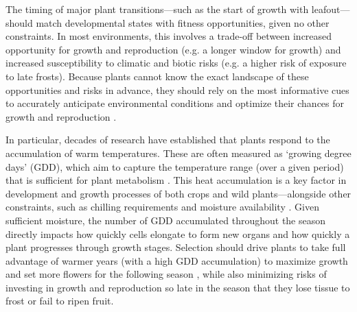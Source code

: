 \documentclass[11pt,letter]{article}
\newcommand{\llabel}[1]{\hypertarget{lintarget:#1}{}\linelabel{lin:#1}}
\begin{document}
The timing of major plant transitions---such as the start of growth with leafout---should match developmental states with fitness opportunities, given no other constraints. In most environments, this involves a trade-off between increased opportunity for growth and reproduction (e.g. a longer window for growth) and increased susceptibility to climatic and biotic risks (e.g. a higher risk of exposure to late frosts). Because plants cannot know the exact landscape of these opportunities and risks in advance, they should rely on the most informative cues to accurately anticipate environmental conditions and optimize their chances for growth and reproduction \citep{Chevin2015, Bonamour2019}.

In particular, decades of research have established that plants respond to the accumulation of warm temperatures. These are often measured as `growing degree days' (GDD), which aim to capture the temperature range (over a given period) that is sufficient for plant metabolism \citep{Chuine2017}.
This heat accumulation is a key factor in development and growth processes of both crops and wild plants---\llabel{moist2}alongside other constraints, such as chilling requirements \citep{Chuine2017} and moisture availability \citep{Garonna2018}. \llabel{moist3}Given sufficient moisture, the number of GDD accumulated throughout the season directly impacts how quickly cells elongate to form new organs and how quickly a plant progresses through growth stages. Selection should drive plants to take full advantage of warmer years (with a high GDD accumulation) to maximize growth and set more flowers for the following season \citep{larcher1980}, while also minimizing risks of investing in growth and reproduction so late in the season that they lose tissue to frost or fail to ripen fruit.
\end{document}
